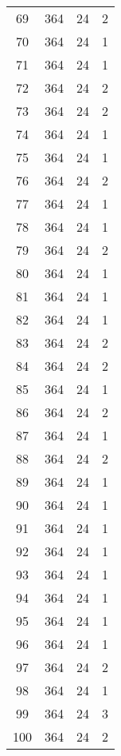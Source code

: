 \begin{longtable}[!]{c|ccc}
	69	& 364	& 24	& 2	\\
	70	& 364	& 24	& 1	\\
	71	& 364	& 24	& 1	\\
	72	& 364	& 24	& 2	\\
	73	& 364	& 24	& 2	\\
	74	& 364	& 24	& 1	\\
	75	& 364	& 24	& 1	\\
	76	& 364	& 24	& 2	\\
	77	& 364	& 24	& 1	\\
	78	& 364	& 24	& 1	\\
	79	& 364	& 24	& 2	\\
	80	& 364	& 24	& 1	\\
	81	& 364	& 24	& 1	\\
	82	& 364	& 24	& 1	\\
	83	& 364	& 24	& 2	\\
	84	& 364	& 24	& 2	\\
	85	& 364	& 24	& 1	\\
	86	& 364	& 24	& 2	\\
	87	& 364	& 24	& 1	\\
	88	& 364	& 24	& 2	\\
	89	& 364	& 24	& 1	\\
	90	& 364	& 24	& 1	\\
	91	& 364	& 24	& 1	\\
	92	& 364	& 24	& 1	\\
	93	& 364	& 24	& 1	\\
	94	& 364	& 24	& 1	\\
	95	& 364	& 24	& 1	\\
	96	& 364	& 24	& 1	\\
	97	& 364	& 24	& 2	\\
	98	& 364	& 24	& 1	\\
	99	& 364	& 24	& 3	\\
	100	& 364	& 24	& 2	\\
\end{longtable}



